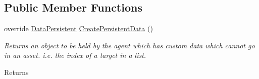 \subsection*{Public Member Functions}
\begin{DoxyCompactItemize}
\item 
\hypertarget{class_skyrates_1_1_a_i_1_1_state_1_1_state_machine_a32959837d315d118a295d69f07807f47}{override \hyperlink{class_skyrates_1_1_a_i_1_1_behavior_1_1_data_persistent}{Data\-Persistent} \hyperlink{class_skyrates_1_1_a_i_1_1_state_1_1_state_machine_a32959837d315d118a295d69f07807f47}{Create\-Persistent\-Data} ()}\label{class_skyrates_1_1_a_i_1_1_state_1_1_state_machine_a32959837d315d118a295d69f07807f47}

\begin{DoxyCompactList}\small\item\em Returns an object to be held by the agent which has custom data which cannot go in an asset. i.\-e. the index of a target in a list. 

\begin{DoxyReturn}{Returns}


\end{DoxyReturn}
\end{DoxyCompactList}
\end{DoxyCompactItemize}
